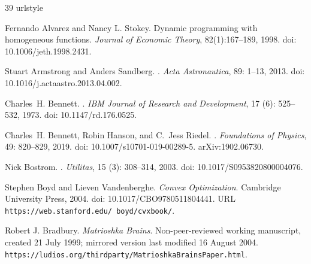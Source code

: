 \begin{thebibliography}{39}
\providecommand{\natexlab}[1]{#1}
\providecommand{\url}[1]{\texttt{#1}}
\expandafter\ifx\csname urlstyle\endcsname\relax
  \providecommand{\doi}[1]{doi: #1}\else
  \providecommand{\doi}{doi: \begingroup \urlstyle{rm}\Url}\fi

Fernando Alvarez and Nancy L. Stokey.
\newblock Dynamic programming with homogeneous functions.
\newblock \emph{Journal of Economic Theory}, 82(1):167--189, 1998.
\newblock \doi{10.1006/jeth.1998.2431}.

Stuart Armstrong and Anders Sandberg.
.
\newblock \emph{Acta Astronautica}, 89: 1--13, 2013.
\newblock \doi{10.1016/j.actaastro.2013.04.002}.

Charles~H. Bennett.
.
\newblock \emph{IBM Journal of Research and Development}, 17
  (6): 525--532, 1973.
\newblock \doi{10.1147/rd.176.0525}.

Charles~H. Bennett, Robin Hanson, and C.~Jess Riedel.
.
\newblock \emph{Foundations of Physics}, 49: 820--829, 2019.
\newblock \doi{10.1007/s10701-019-00289-5}.
\newblock arXiv:1902.06730.

Nick Bostrom.
.
\newblock \emph{Utilitas}, 15 (3): 308--314, 2003.
\newblock \doi{10.1017/S0953820800004076}.

Stephen Boyd and Lieven Vandenberghe.
\newblock \emph{{Convex Optimization}}.
\newblock Cambridge University Press, 2004.
\newblock \doi{10.1017/CBO9780511804441}.
\newblock URL \url{https://web.stanford.edu/~boyd/cvxbook/}.

Robert J. Bradbury.
\newblock \emph{Matrioshka Brains}.
\newblock Non-peer-reviewed working manuscript, created 21 July 1999;
mirrored version last modified 16 August 2004.
\newblock \url{https://ludios.org/thirdparty/MatrioshkaBrainsPaper.html}.


\end{thebibliography}
